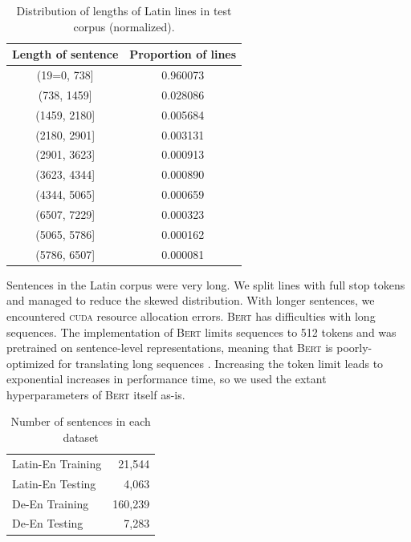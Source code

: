 \documentclass[11pt,a4paper]{article}
\begin{document}
\begin{table}
    \begin{tabular}{|c | c | } 
         \hline 
          Length of sentence & Proportion of lines \\
          \hline 
        (19=0, 738]    &  0.960073\\
        (738, 1459]   &   0.028086\\
        (1459, 2180]  &   0.005684\\
        (2180, 2901]  &   0.003131\\
        (2901, 3623]  &   0.000913\\
        (3623, 4344]  &   0.000890\\
        (4344, 5065]  &   0.000659\\
        (6507, 7229]   &  0.000323\\
        (5065, 5786]   &  0.000162\\
        (5786, 6507]   &  0.000081\\
        \hline
    \end{tabular}
    \caption{Distribution of lengths of Latin lines in test corpus (normalized).}
    \label{tbl:distlatin}
\end{table}

Sentences in the Latin corpus were very long.
We split lines with full stop tokens and managed to reduce the skewed distribution.
With longer sentences, we encountered \textsc{cuda} resource allocation errors.
\textsc{Bert} has difficulties with long sequences.
The implementation of \textsc{Bert} limits sequences to 512 tokens and was pretrained on sentence-level representations, meaning that \textsc{Bert} is poorly-optimized for translating long sequences \cite{devlin2018Bert, yang2019making, dai2019transformerxl}.
Increasing the token limit leads to exponential increases in performance time,
so we used the extant hyperparameters of \textsc{Bert} itself as-is.

\begin{table}
    \centering
    \begin{tabular}{| l | r |}
        \hline
        Latin-En Training & 21,544 \\
        Latin-En Testing & 4,063 \\
        De-En Training & 160,239 \\
        De-En Testing & 7,283 \\
        \hline
    \end{tabular}
    \caption{Number of sentences in each dataset}
    \label{tbl:sentences}
\end{table}
\end{document}
